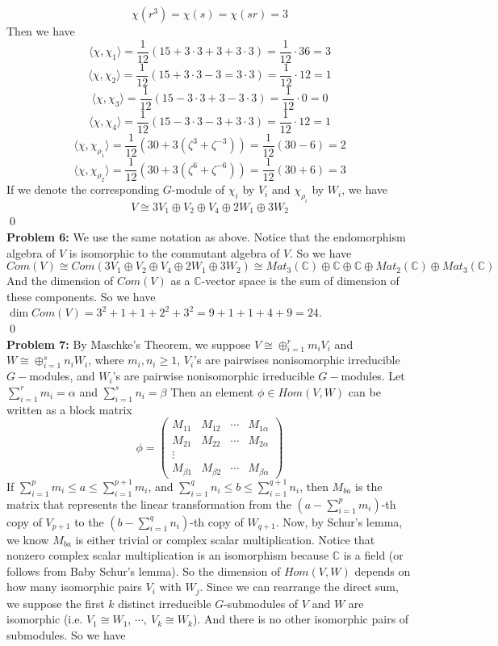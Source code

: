 \documentclass[12pt]{amsart}
\newcommand{\C}{\mathbb{C}}
\begin{document}
\[\chi(r^3)=\chi(s)=\chi(sr)=3\]
Then we have 
\[\langle \chi,\chi_1\rangle=\frac{1}{12}(15+3\cdot 3+3+3\cdot 3)=\frac{1}{12}\cdot 36=3 \]
\[\langle \chi,\chi_2\rangle=\frac{1}{12}(15+3\cdot 3-3=3\cdot 3)=\frac{1}{12}\cdot 12=1  \]
\[\langle \chi,\chi_3\rangle=\frac{1}{12}(15-3\cdot 3+3-3\cdot 3)=\frac{1}{12}\cdot 0=0 \]
\[\langle \chi,\chi_4\rangle=\frac{1}{12}(15-3\cdot 3-3+3\cdot 3)=\frac{1}{12}\cdot 12=1 \]
\[\langle \chi,\chi_{\rho_1}\rangle=\frac{1}{12}(30+3(\zeta^3+\zeta^{-3}))=\frac{1}{12}(30-6)=2 \]
\[\langle \chi,\chi_{\rho_2}\rangle=\frac{1}{12}(30+3(\zeta^6+\zeta^{-6}))=\frac{1}{12}(30+6)=3 \]
If we denote the corresponding $G$-module of $\chi_i$ by $V_i$ and $\chi_{\rho_i}$ by $W_i$, we have 
\[V\cong 3V_1\oplus V_2\oplus V_4\oplus 2W_1\oplus 3W_2\]
\qed\\
\textbf{Problem 6:} We use the same notation as above. Notice that the endomorphism algebra of $V$ is isomorphic to the commutant algebra of $V$. So we have 
\[Com(V)\cong Com(3V_1\oplus V_2\oplus V_4\oplus 2W_1\oplus 3W_2)\cong Mat_3(\C)\oplus \C\oplus \C\oplus Mat_2(\C)\oplus Mat_3(\C)\]
And the dimension of $Com(V)$ as a $\C$-vector space is the sum of dimension of these components. So we have $\dim Com(V)=3^2+1+1+2^2+3^2=9+1+1+4+9=24$.
\\\qed\\
\textbf{Problem 7:} By Maschke's Theorem, we suppose $V\cong \oplus_{i=1}^rm_iV_i$ and $W\cong \oplus_{i=1}^sn_iW_i$, where $m_i,n_i\geq 1$, $V_i$'s are pairwises nonisomorphic irreducible $G-$modules, and $W_i$'s are pairwise nonisomorphic irreducible $G-$modules. Let 
$\sum_{i=1}^rm_i=\alpha$ and $\sum_{i=1}^sn_i=\beta$
Then an element $\phi\in Hom(V,W)$ can be written as a block matrix
\[\phi=
    \begin{pmatrix}
    M_{11}&M_{12}&\cdots & M_{1\alpha}\\
    M_{21}&M_{22}&\cdots & M_{2\alpha}\\
    \vdots\\
    M_{\beta 1 }&M_{\beta 2}&\cdots & M_{\beta\alpha}  
    \end{pmatrix}
    \]
If $\sum_{i=1}^pm_i\leq a\leq \sum_{i=1}^{p+1}m_i$, and $\sum_{i=1}^qn_i\leq b\leq \sum_{i=1}^{q+1}n_i$, then $M_{ba}$ is the matrix that represents the linear transformation from the $(a-\sum_{i=1}^pm_i)$-th copy of $V_{p+1}$ to the $(b-\sum_{i=1}^{q}n_i)$-th copy of $W_{q+1}$.  Now, by Schur's lemma, we know $M_{ba}$ is either trivial or complex scalar multiplication. Notice that nonzero complex scalar multiplication is an isomorphism because $\C$ is a field (or follows from Baby Schur's lemma). So the dimension of $Hom(V,W)$ depends on how many isomorphic pairs $V_i$ with $W_j$. Since we can rearrange the direct sum, we suppose the first $k$ distinct irreducible $G$-submodules of $V$ and $W$ are isomorphic (i.e. $V_1\cong W_1$, $\cdots, \ V_k\cong W_k$). And there is no other isomorphic pairs of submodules. So we have 
\end{document}
